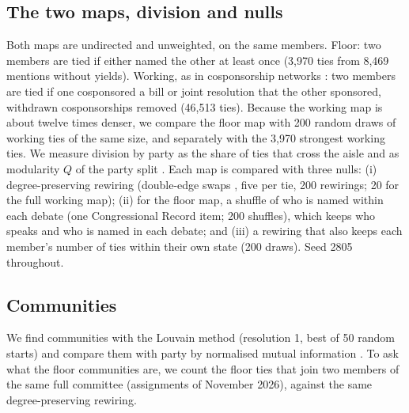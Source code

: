 \documentclass[9pt,twocolumn,twoside]{pnas-new}
\begin{document}
{\subsection*{The two maps, division and nulls}
Both maps are undirected and unweighted, on the same members. Floor: two members are tied if either named the other
at least once (3,970 ties from 8,469 mentions without yields). Working, as in cosponsorship networks \cite{fowler2006}:
two members are tied if one cosponsored a bill or joint resolution that the other sponsored, withdrawn cosponsorships
removed (46,513 ties). Because the working map is about twelve times denser, we compare the floor map with 200 random
draws of working ties of the same size, and separately with the 3,970 strongest working ties. We measure division by
party as the share of ties that cross the aisle and as modularity $Q$ of the party split \cite{newman2006}. Each map
is compared with three nulls: (i) degree-preserving rewiring (double-edge swaps \cite{maslov2002}, five per tie, 200
rewirings; 20 for the full working map); (ii) for the floor map, a shuffle of who is named within each debate (one
Congressional Record item; 200 shuffles), which keeps who speaks and who is named in each debate; and (iii) a rewiring
that also keeps each member's number of ties within their own state (200 draws). Seed 2805 throughout.

\subsection*{Communities}
We find communities with the Louvain method \cite{blondel2008} (resolution 1, best of 50 random starts) and compare
them with party by normalised mutual information \cite{danon2005}. To ask what the floor communities are, we count the
floor ties that join two members of the same full committee (assignments of November 2026), against the same
degree-preserving rewiring.

}
\end{document}

